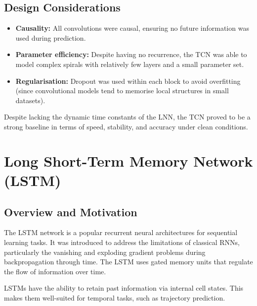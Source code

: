 \subsection*{Design Considerations}
\begin{itemize}
    \item \textbf{Causality:} All convolutions were causal, ensuring no future information was used during prediction.
    \item \textbf{Parameter efficiency:} Despite having no recurrence, the TCN was able to model complex spirals with relatively few layers and a small parameter set.
    \item \textbf{Regularisation:} Dropout was used within each block to avoid overfitting (since convolutional models tend to memorise local structures in small datasets).
\end{itemize}

Despite lacking the dynamic time constants of the LNN, the TCN proved to be a strong baseline in terms of speed, stability, and accuracy under clean conditions.

\section{Long Short-Term Memory Network (LSTM)}

\subsection*{Overview and Motivation}
The LSTM network is a popular recurrent neural architectures for sequential learning tasks. It was introduced to address the limitations of classical RNNs, particularly the vanishing and exploding gradient problems during backpropagation through time. The LSTM uses gated memory units that regulate the flow of information over time.

LSTMs have the ability to retain past information via internal cell states. This makes them well-suited for temporal tasks, such as trajectory prediction.


